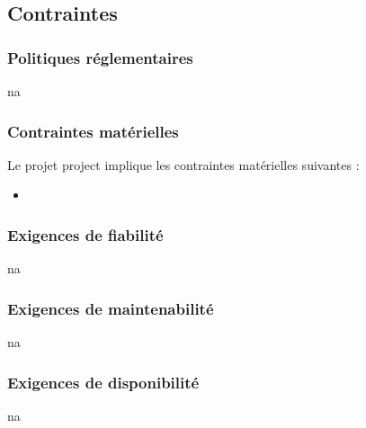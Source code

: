 \newpage
\subsection{Contraintes} %

\subsubsection{Politiques réglementaires} %
\gls{na}
\subsubsection{Contraintes matérielles} %
Le projet \gls{project} implique les contraintes matérielles suivantes :\\
\begin{itemize}
    \item \complete
\end{itemize}

\subsubsection{Exigences de fiabilité} %
\gls{na}
\subsubsection{Exigences de maintenabilité}%
\gls{na}
\subsubsection{Exigences de disponibilité}%
\gls{na}
